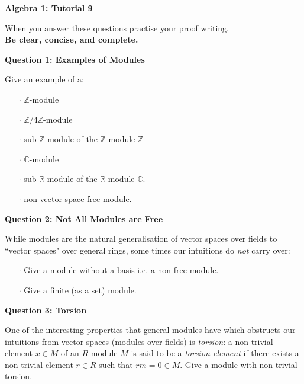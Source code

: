 \documentclass[11pt,twoside, a4paper]{report}
\theoremstyle{plain}
\theoremstyle{definition}
\begin{document}
\begin{center}
 \noindent\makebox[\linewidth]{\rule{14cm}{1.5pt}} 
{\bf Algebra 1: Tutorial 9 }
 \noindent\makebox[\linewidth]{\rule{14cm}{1.5pt}}  
 \noindent\makebox[\linewidth]{\rule{14cm}{3pt}}
\end{center}

\noindent When you answer these questions practise your proof writing.\\
  {\bf Be clear, concise, and complete.}
  
  
\begin{center}
{\bf Question 1: Examples of Modules}
\end{center}

Give an example of a: 

\begin{itemize}
\item[$\cdot$] $\mathbb{Z}$-module
\item[$\cdot$] $\mathbb{Z}/4\mathbb{Z}$-module
\item[$\cdot$] sub-$\mathbb{Z}$-module of the $\mathbb{Z}$-module $\mathbb{Z}$
\item[$\cdot$] $\mathbb{C}$-module
\item[$\cdot$]  sub-$\mathbb{R}$-module of the $\mathbb{R}$-module $\mathbb{C}$.
\item[$\cdot$] non-vector space free module. 

\end{itemize}



\begin{center}
{\bf Question 2: Not All Modules are Free}
\end{center} 

While modules are the natural generalisation of vector spaces over fields to ``vector spaces" over general rings, some times our intuitions do \emph{not} carry over: 
\begin{itemize} 
\item[$\cdot$] Give a module without a basis i.e. a non-free module.
\item[$\cdot$] Give a finite (as a set) module. 
\end{itemize}


\begin{center}
{\bf Question 3: Torsion}
\end{center}

One of the interesting properties that general modules have which obstructs our intuitions from vector spaces (modules over fields) is \emph{torsion}: a non-trivial element $x \in M$ of an $R$-module $M$ is said to be a \emph{torsion element} if there exists a non-trivial element $r \in R$ such that $rm=0 \in M$. Give a module with non-trivial torsion.
\end{document}
